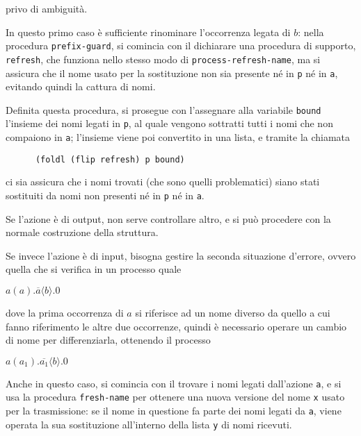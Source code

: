 privo di ambiguit\`a.

In questo primo caso \`e sufficiente rinominare l'occorrenza legata di $b$:
nella procedura \lstinline{prefix-guard}, si comincia con il dichiarare una
procedura di supporto, \lstinline{refresh}, che funziona nello stesso modo
di \lstinline{process-refresh-name}, ma si assicura che il nome usato per
la sostituzione non sia presente n\'e in \lstinline{p} n\'e in
\lstinline{a}, evitando quindi la cattura di nomi.

Definita questa procedura, si prosegue con l'assegnare alla variabile
\lstinline{bound} l'insieme dei nomi legati in \lstinline{p}, al quale
vengono sottratti tutti i nomi che non compaiono in \lstinline{a};
l'insieme viene poi convertito in una lista, e tramite la chiamata

\begin{lstlisting}
      (foldl (flip refresh) p bound)
\end{lstlisting}

ci sia assicura che i nomi trovati (che sono quelli problematici) siano
stati sostituiti da nomi non presenti n\'e in \lstinline{p} n\'e in
\lstinline{a}.

Se l'azione \`e di output, non serve controllare altro, e si pu\`o
procedere con la normale costruzione della struttura.

Se invece l'azione \`e di input, bisogna gestire la seconda situazione
d'errore, ovvero quella che si verifica in un processo quale

\begin{pilisting}
$
    a(a).\overline{a}\langle b\rangle.0
$
\end{pilisting}

dove la prima occorrenza di $a$ si riferisce ad un nome diverso da
quello a cui fanno riferimento le altre due occorrenze, quindi \`e
necessario operare un cambio di nome per differenziarla, ottenendo il
processo

\begin{pilisting}
$
    a(a_1).\overline{a_1}\langle b\rangle.0
$
\end{pilisting}

Anche in questo caso, si comincia con il trovare i nomi legati dall'azione
\lstinline{a}, e si usa la procedura \lstinline{fresh-name} per ottenere
una nuova versione del nome \lstinline{x} usato per la trasmissione: se il
nome in questione fa parte dei nomi legati da \lstinline{a}, viene
operata la sua sostituzione all'interno della lista \lstinline{y} di nomi
ricevuti.

